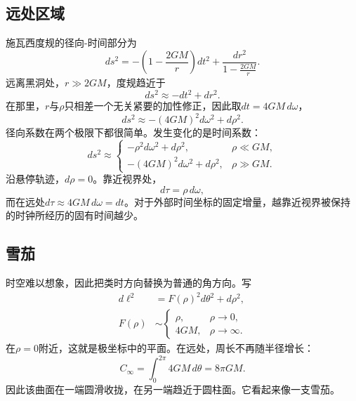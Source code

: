 \subsection{远处区域}

施瓦西度规的径向-时间部分为
\begin{equation}
ds^2
=-\left(1-\frac{2GM}{r}\right)dt^2
+\frac{dr^2}{1-\frac{2GM}{r}}.
\label{eq:l04-schwarzschild}
\end{equation}
远离黑洞处，\(r\gg2GM\)，度规趋近于
\begin{equation}
ds^2\approx-dt^2+dr^2.
\end{equation}
在那里，\(r\)与\(\rho\)只相差一个无关紧要的加性修正，因此取\(dt=4GM\,d\omega\)，
\begin{equation}
ds^2\approx-(4GM)^2d\omega^2+d\rho^2.
\label{eq:l04-far}
\end{equation}
径向系数在两个极限下都很简单。发生变化的是时间系数：
\begin{equation}
ds^2\approx
\begin{cases}
-\rho^2d\omega^2+d\rho^2, & \rho\ll GM,\\[3pt]
-(4GM)^2d\omega^2+d\rho^2, & \rho\gg GM.
\end{cases}
\label{eq:l04-two-limits}
\end{equation}
沿悬停轨迹，\(d\rho=0\)。靠近视界处，
\begin{equation}
d\tau=\rho\,d\omega,
\end{equation}
而在远处\(d\tau\approx4GM\,d\omega=dt\)。对于外部时间坐标的固定增量，越靠近视界被保持的时钟所经历的固有时间越少。

\subsection{雪茄}

时空难以想象，因此把类时方向替换为普通的角方向。写
\begin{equation}
\begin{aligned}
d\ell^2&=F(\rho)^2d\theta^2+d\rho^2,\\
F(\rho)&\sim
\begin{cases}
\rho, & \rho\to0,\\
4GM, & \rho\to\infty.
\end{cases}
\end{aligned}
\label{eq:l04-cigar}
\end{equation}
在\(\rho=0\)附近，这就是极坐标中的平面。在远处，周长不再随半径增长：
\begin{equation}
C_\infty=\int_0^{2\pi}4GM\,d\theta=8\pi GM.
\label{eq:l04-cigar-circumference}
\end{equation}
因此该曲面在一端圆滑收拢，在另一端趋近于圆柱面。它看起来像一支雪茄。

